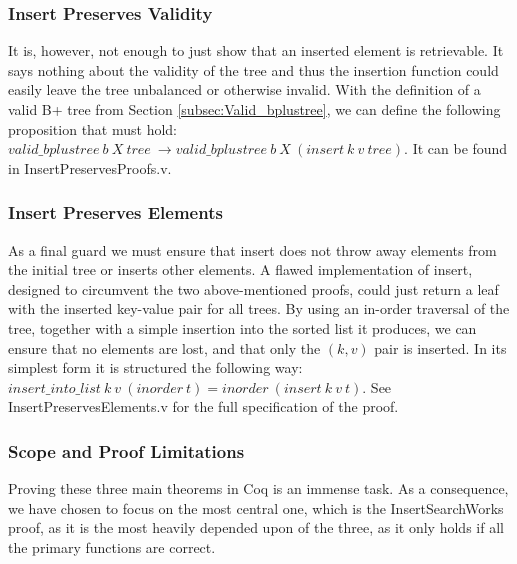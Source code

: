 \subsubsection{Insert Preserves Validity}
It is, however, not enough to just show that an inserted element is retrievable. It says nothing about the validity of the tree and thus the insertion function could easily leave the tree unbalanced or otherwise invalid. With the definition of a valid B+ tree from Section \ref{subsec:Valid_bplustree}, we can define the following proposition that must hold: $valid\_bplustree\ b\ X\ tree\ \rightarrow valid\_bplustree\ b\ X\ (insert\ k\ v\ tree)$. It can be found in InsertPreservesProofs.v.

\subsubsection{Insert Preserves Elements}
As a final guard we must ensure that insert does not throw away elements from the initial tree or inserts other elements. A flawed implementation of insert, designed to circumvent the two above-mentioned proofs, could just return a leaf with the inserted key-value pair for all trees. By using an in-order traversal of the tree, together with a simple insertion into the sorted list it produces, we can ensure that no elements are lost, and that only the $(k, v)$ pair is inserted. In its simplest form it is structured the following way: $insert\_into\_list\ k\ v\ (inorder\ t) = inorder\ (insert\ k\ v\ t)$. See InsertPreservesElements.v for the full specification of the proof.

\subsubsection{Scope and Proof Limitations}
Proving these three main theorems in Coq is an immense task. As a consequence, we have chosen to focus on the most central one, which is the InsertSearchWorks proof, as it is the most heavily depended upon of the three, as it only holds if all the primary functions are correct.

